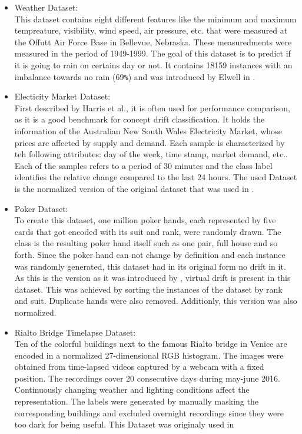 \documentclass[12pt,oneside,a4paper,parskip]{scrbook}
\begin{document}
\begin{itemize}
  \item Weather Dataset: \\
        This dataset contains eight different features like the minimum and maximum tempreature, visibility, wind speed, 
        air pressure, etc. that were measured at the Offutt Air Force Base in Bellevue, Nebraska. These measuredments were
        measured in the period of 1949-1999. The goal of this dataset is to predict if it is going to rain on certains day or not.
        It contains 18159 instances with an imbalance towards no rain (69\verb|%|) and was introduced by Elwell in \cite{weather}.

  \item Electicity Market Dataset:\\
        First described by Harris et al., it is often used for performance comparison, as it is a good benchmark for concept drift 
        classification. It holds the information of the Australian New South Wales Electricity Market, whose prices are affected 
        by supply and demand. Each sample is characterized by teh following attributes: day of the week, time stamp, market demand,
        etc.. Each of the samples refers to a period of 30 minutes and the class label identiﬁes the relative change compared to the
        last 24 hours. The used Dataset is the normalized version of the original dataset that was used in \cite{MLonDataStreams}.

  \item Poker Dataset: \\
        To create this dataset, one million poker hands, each represented by five cards that got encoded with its suit and rank, 
        were randomly drawn. The class is the resulting poker hand itself such as one pair, full house and so forth.
        Since the poker hand can not change by definition and each instance was randomly generated, this dataset had 
        in its original form no drift in it.
        As this is the version as it was introduced by \cite{bifet2013efficient}, virtual drift is present in this dataset. 
        This was achieved by sorting the instances of the dataset by rank and suit. Duplicate hands were also removed.
        Additionly, this version was also normalized.

  \item Rialto Bridge Timelapse Dataset: \\
        Ten of the colorful buildings next to the famous Rialto bridge in Venice are encoded in a normalized 
        27-dimensional RGB histogram. The images were obtained from time-lapsed videos captured by a webcam with a fixed
        position. The recordings cover 20 consecutive days during may-june 2016. Continuously changing weather and 
        lighting conditions affect the representation. The labels were generated by manually masking the corresponding 
        buildings and excluded overnight recordings since they were too dark for being useful. 
        This Dataset was originaly used in \cite{movingsquaresChessboardRialtobridge}
\end{itemize}
\end{document}
